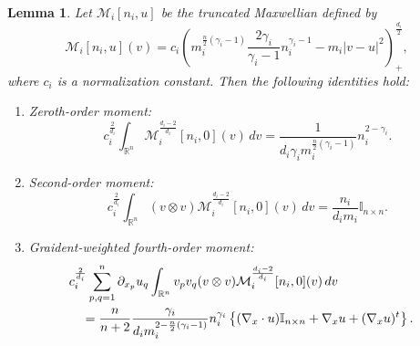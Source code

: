 \documentclass[10pt,reqno]{amsart}
\numberwithin{equation}{section}
\newtheorem{lemma}{Lemma}[section]
\newcommand{\R}{\mathbb R}
\newcommand{\pa}{\partial}
\begin{document}
\begin{lemma} Let $\mathcal{M}_i[n_i, u]$ be the truncated Maxwellian defined by
\[
\mathcal{M}_i[n_i,u](v) = c_i \left( m_i^{\frac{n}{2}(\gamma_i-1)} \frac{2\gamma_i}{\gamma_i-1} n_i^{\gamma_i - 1} - m_i |v-u|^2 \right)_+^{\frac{d_i}{2}},
\]
where $c_i$ is a normalization constant. Then the following identities hold:
\begin{enumerate}[label=(\roman*)]
\item[(i)] Zeroth-order moment:
\[
c_i^{\frac{2}{d_i}}\int_{\R^n} \mathcal{M}_i^{\frac{d_i - 2}{d_i}}[n_i, 0](v) \,dv = \frac{1}{d_i \gamma_i m_i^{\frac{n}{2}(\gamma_i - 1)}} n_i^{2 - \gamma_i}.
\]
\item[(ii)] Second-order moment:
\[
c_i^{\frac{2}{d_i}}\int_{\R^n} (v  \otimes v) \mathcal{M}_i^{\frac{d_i - 2}{d_i}}[n_i, 0](v)\,dv = \frac{n_i}{d_i m_i} \mathbb{I}_{n \times n}.
\]
\item[(iii)] Graident-weighted fourth-order moment:
\begin{align*}
&c_i^{\frac{2}{d_i}} \sum_{p,q=1}^n \pa_{x_p} u_q \int_{\R^n} v_p  v_q  (v \otimes v) \mathcal{M}_i^{\frac{d_i - 2}{d_i}}[n_i, 0](v) \, dv \cr
&\quad = \frac{n}{n+2}\frac{\gamma_i}{d_i m_i^{2 - \frac n2(\gamma_i-1)}}n_i^{\gamma_i}\left\{(\nabla_x\cdot u) \mathbb{I}_{n\times n} +\nabla_x u+(\nabla_xu)^t \right\}.
\end{align*}
\end{enumerate}
\end{lemma}
\end{document}
